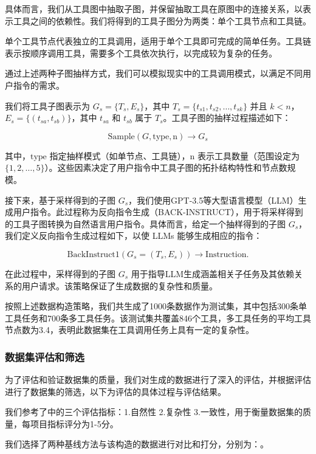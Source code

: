 具体而言，我们从工具图中抽取子图，并保留抽取工具在原图中的连接关系，以表示工具之间的依赖性。我们将得到的工具子图分为两类：单个工具节点和工具链。

单个工具节点代表独立的工具调用，适用于单个工具即可完成的简单任务。工具链表示按顺序调用工具，需要多个工具依次执行，以完成较为复杂的任务。

通过上述两种子图抽样方式，我们可以模拟现实中的工具调用模式，以满足不同用户指令的需求。

我们将工具子图表示为 \( G_s = \{T_s, E_s\} \)，其中 \( T_s = \{t_{s1}, t_{s2}, \dots, t_{sk}\} \) 并且 \( k < n \)，\( E_s = \{(t_{sa}, t_{sb})\} \)，其中 \( t_{sa} \) 和 \( t_{sb} \) 属于 \( T_s \)。工具子图的抽样过程描述如下：

\[
\text{Sample}(G, \text{type}, \text{n}) \rightarrow G_s
\]

其中，\(\text{type}\) 指定抽样模式（如单节点、工具链），\(\text{n}\) 表示工具数量（范围设定为 \(\{1, 2, \dots, 5\}\)）。这些因素决定了用户指令中工具子图的拓扑结构特性和节点数规模。

接下来，基于采样得到的子图 \( G_s \)，我们使用GPT-3.5等大型语言模型（LLM）生成用户指令。此过程称为反向指令生成（BACK-INSTRUCT），用于将采样得到的工具子图转换为自然语言用户指令。具体而言，给定一个抽样得到的子图 \( G_s \)，我们定义反向指令生成过程如下，以使 LLMs 能够生成相应的指令：

\[
\text{BackInstruct1}(G_s = (T_s, E_s)) \rightarrow \text{Instruction}.
\]

在此过程中，采样得到的子图 \( G_s \) 用于指导LLM生成涵盖相关子任务及其依赖关系的用户请求。该策略保证了生成数据的复杂性和质量。

按照上述数据构造策略，我们共生成了1000条数据作为测试集，其中包括300条单工具任务和700条多工具任务。该测试集共覆盖846个工具，多工具任务的平均工具节点数为3.4，表明此数据集在工具调用任务上具有一定的复杂性。

\subsubsection{数据集评估和筛选}

为了评估和验证数据集的质量，我们对生成的数据进行了深入的评估，并根据评估进行了数据集的筛选，以下为评估的具体过程与评估结果。

我们参考了\cite{shen2023taskbench}中的三个评估指标：1.自然性 2.复杂性 3.一致性，用于衡量数据集的质量，每项目指标评分为1-5分。

我们选择了两种基线方法与该构造的数据进行对比和打分，分别为：。

